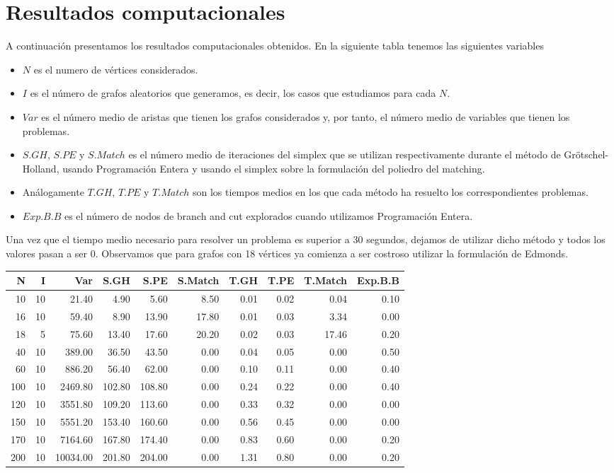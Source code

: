 \documentclass[twoside,a4paper,openright,12pt,tikz]{book}
\begin{document}
\section{Resultados computacionales}
A continuación presentamos los resultados computacionales obtenidos. En la siguiente tabla tenemos las siguientes variables 
\begin{itemize}
\item $N$ es el numero de vértices considerados.
\item $I$ es el número de grafos aleatorios que generamos, es decir, los casos que estudiamos para cada $N$.
\item $Var$ es el número medio de aristas que tienen los grafos considerados y, por tanto, el número medio de variables que tienen los problemas.
\item $S.GH$, $S.PE$ y $S.Match$ es el número medio de iteraciones del simplex que se utilizan respectivamente durante el método de Grötschel-Holland, usando Programación Entera y usando el simplex sobre la formulación del poliedro del matching.
\item Análogamente $T.GH$, $T.PE$ y $T.Match$ son los tiempos medios en los que cada método ha resuelto los correspondientes problemas.
\item $Exp.B.B$ es el número de nodos de branch and cut explorados cuando utilizamos Programación Entera.
\end{itemize} 
Una vez que el tiempo medio necesario para resolver un problema es superior a 30 segundos, dejamos de utilizar dicho método y todos los valores pasan a ser $0$. Observamos que para grafos con 18 vértices ya comienza a ser costroso utilizar la formulación de Edmonds.
\begin{table}[ht]
\centering
\begin{tabular}{rrrrrrrrrr}
  \hline
N & I & Var & S.GH & S.PE & S.Match & T.GH & T.PE & T.Match & Exp.B.B \\ 
  \hline
10 & 10 & 21.40 & 4.90 & 5.60 & 8.50 &   0.01 & 0.02 & 0.04 & 0.10 \\ 
16 & 10 & 59.40 & 8.90 & 13.90 & 17.80 & 0.01 & 0.03 & 3.34 & 0.00 \\ 
18 &  5 & 75.60 & 13.40 & 17.60 & 20.20& 0.02 & 0.03 & 17.46 & 0.20 \\ 
 \hline
40 & 10 & 389.00 & 36.50& 43.50 & 0.00 & 0.04 & 0.05 & 0.00 & 0.50 \\ 
60 & 10 & 886.20 & 56.40& 62.00 & 0.00 & 0.10 & 0.11 & 0.00 & 0.40 \\ 
100 & 10 & 2469.80 & 102.80 & 108.80 & 0.00 & 0.24 & 0.22 & 0.00 & 0.40 \\ 
120 &   10 & 3551.80 & 109.20 & 113.60 & 0.00 & 0.33 & 0.32 & 0.00 & 0.00 \\ 
150 &   10 & 5551.20 & 153.40 & 160.60 & 0.00 & 0.56 & 0.45 & 0.00 & 0.00 \\ 
170 &   10 & 7164.60 & 167.80 & 174.40 & 0.00 & 0.83 & 0.60 & 0.00 & 0.20 \\ 
200 &   10 & 10034.00 & 201.80 & 204.00 & 0.00 & 1.31 & 0.80 & 0.00 & 0.20 \\ 
  \hline
 \end{tabular}
 \end{table}
\end{document}
